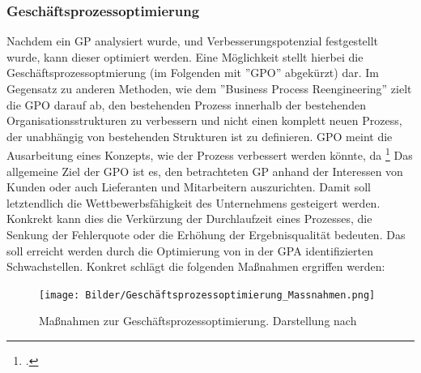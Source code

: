 


\subsubsection{Geschäftsprozessoptimierung}

Nachdem ein GP analysiert wurde, und Verbesserungspotenzial festgestellt wurde, kann dieser optimiert werden. Eine Möglichkeit stellt hierbei die Geschäftsprozessoptmierung (im Folgenden mit ''GPO'' abgekürzt) dar. 
Im Gegensatz zu anderen Methoden, wie dem ''Business Process Reengineering'' zielt die GPO darauf ab, den bestehenden Prozess innerhalb der bestehenden Organisationsstrukturen zu verbessern und nicht einen komplett neuen Prozess, der unabhängig von bestehenden Strukturen ist zu definieren. GPO meint die Ausarbeitung eines Konzepts, wie der Prozess verbessert werden könnte, da \footcite[Vgl.][S. 31]{theorie_gadatsch_grundkurs_geschäftsprozessmanagement_2010} Das allgemeine Ziel der GPO ist es, den betrachteten GP anhand der Interessen von Kunden oder auch Lieferanten und Mitarbeitern auszurichten. Damit soll letztendlich die Wettbewerbsfähigkeit des Unternehmens gesteigert werden. Konkrekt kann dies die Verkürzung der Durchlaufzeit eines Prozesses, die Senkung der Fehlerquote oder die Erhöhung der Ergebnisqualität bedeuten. Das soll erreicht werden durch die Optimierung von in der GPA identifizierten Schwachstellen. Konkret schlägt \cite[][]{theorie_bleicher_organisation_1991} die folgenden Ma\ss nahmen ergriffen werden:

\begin{figure}[H]
    \centering
    \texttt{[image: Bilder/Geschäftsprozessoptimierung\_Massnahmen.png]}
    \caption[Ma\ss nahmen zur Geschäftsprozessoptimierung]{Ma\ss nahmen zur Geschäftsprozessoptimierung. Darstellung nach \cite[][]{theorie_bleicher_organisation_1991}}
    \label{fig:Geschäftsprozessoptimierung_Massnahmen}
\end{figure}

